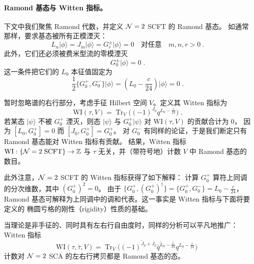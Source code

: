 \documentclass[11pt,a4paper,fontset=windows]{ctexart}
\numberwithin{equation}{section}
\newcommand{\myparagraph}[1]{\paragraph{#1}\mbox\\}
\newcommand{\Z}{\mathbb{Z}}
\def\f{\phi}
\def\t{\tau}
\def\til{\tilde}
\def\Tr{\tr}
\newcommand{\tr}{\operatorname{Tr}}
\begin{document}
\myparagraph{Ramond 基态与 Witten 指标。}
下文中我们聚焦 Ramond 代数，并定义 ${\cal N}=2$ SCFT 的 Ramond 基态。
如通常那样，要求基态被所有正模湮灭：
$$
L_n \lvert \f \rangle=J_m \lvert \f \rangle = G^\pm_r \lvert \f \rangle = 0 \quad\text{对任意} \quad m,n,r > 0\;.
$$
此外，它们还必须被费米型流的零模湮灭
$$
G^\pm_0\lvert \f \rangle=0\;.
$$
这一条件把它们的 $L_0$ 本征值固定为
$$
\frac{1}{2} \{G^+_0,G^-_0\}  \lvert \f \rangle= \left(L_0 -\frac{c}{24}\right) \lvert \f \rangle = 0 \;.
$$


暂时忽略谱的右行部分，考虑手征 Hilbert 空间 $V$。定义其 Witten 指标为
$$
\text{WI}(\t,V) = \Tr_V \big((-1)^{ J_0}q^{ L_0-\frac{ c}{24}} \big)\; . 
$$
若某态 $\lvert \psi \rangle$ 不被 $G^+_0$ 湮灭，则态 $\lvert \psi \rangle$ 与
$G^+_0\lvert \psi \rangle$ 对 $\text{WI}(\t,V)$ 的贡献合计为 0，
因为 $[L_0,G^+_0]=0$ 而 $[J_0,G^+_0]=G^+_0$。
对 $G^-_0$ 有同样的论证，于是我们断定只有 Ramond 基态能对 Witten 指标有贡献。
结果，Witten 指标 $ \text{WI}: \{{\cal N}=2 \;\text{SCFT}\} \to \Z$
与 $\t$ 无关，并（带符号地）计数 $V$ 中 Ramond 基态的数目。


此外注意，${\cal N}=2$ SCFT 的 Witten 指标获得了如下解释：
计算 $G^+_0$ 算符上同调的分次维数，其中 $( G_0^+)^2=0$。
由于 $\{ G^+_0,( G^+_0)^\dag\}  =\{ G^+_0, G^-_0\}   = L_0 -\frac{c}{24}$，
Ramond 基态可解释为上同调中的调和代表。这一事实是 Witten 指标与下面将要定义的
椭圆亏格的刚性（rigidity）性质的基础。


当理论是非手征的、同时具有左右行自由度时，同样的分析可以平凡地推广：Witten 指标
$$
\text{WI}(\t,\bar \t,V) = \Tr_V \big((-1)^{\til J_0+J_0}\bar q^{\til L_0-\frac{\til c}{24}} q^{ L_0-\frac{ c}{24}} \big)\; 
$$
计数对 ${\cal N}=2$ SCA 的左右行拷贝都是 Ramond 基态的态。
\end{document}
